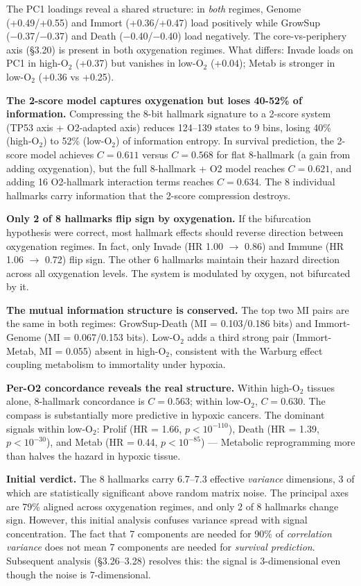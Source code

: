 \documentclass[
  11pt,
]{article}
\begin{document}
The PC1 loadings reveal a shared structure: in \emph{both} regimes,
Genome (+0.49/+0.55) and Immort (+0.36/+0.47) load positively while
GrowSup (−0.37/−0.37) and Death (−0.40/−0.40) load negatively. The
core-vs-periphery axis (§3.20) is present in both oxygenation regimes.
What differs: Invade loads on PC1 in high-\(\mathrm{O}_2\) (+0.37) but
vanishes in low-\(\mathrm{O}_2\) (+0.04); Metab is stronger in
low-\(\mathrm{O}_2\) (+0.36 vs +0.25).

\textbf{The 2-score model captures oxygenation but loses 40-52\% of
information.} Compressing the 8-bit hallmark signature to a 2-score
system (TP53 axis + O2-adapted axis) reduces 124--139 states to 9 bins,
losing 40\% (high-\(\mathrm{O}_2\)) to 52\% (low-\(\mathrm{O}_2\)) of
information entropy. In survival prediction, the 2-score model achieves
\(C = 0.611\) versus \(C = 0.568\) for flat 8-hallmark (a gain from
adding oxygenation), but the full 8-hallmark + O2 model reaches
\(C = 0.621\), and adding 16 O2-hallmark interaction terms reaches
\(C = 0.634\). The 8 individual hallmarks carry information that the
2-score compression destroys.

\textbf{Only 2 of 8 hallmarks flip sign by oxygenation.} If the
bifurcation hypothesis were correct, most hallmark effects should
reverse direction between oxygenation regimes. In fact, only Invade (HR
1.00 \(\to\) 0.86) and Immune (HR 1.06 \(\to\) 0.72) flip sign. The
other 6 hallmarks maintain their hazard direction across all oxygenation
levels. The system is modulated by oxygen, not bifurcated by it.

\textbf{The mutual information structure is conserved.} The top two MI
pairs are the same in both regimes: GrowSup-Death (MI = 0.103/0.186
bits) and Immort-Genome (MI = 0.067/0.153 bits). Low-\(\mathrm{O}_2\)
adds a third strong pair (Immort-Metab, MI = 0.055) absent in
high-\(\mathrm{O}_2\), consistent with the Warburg effect coupling
metabolism to immortality under hypoxia.

\textbf{Per-O2 concordance reveals the real structure.} Within
high-\(\mathrm{O}_2\) tissues alone, 8-hallmark concordance is
\(C = 0.563\); within low-\(\mathrm{O}_2\), \(C = 0.630\). The compass
is substantially more predictive in hypoxic cancers. The dominant
signals within low-\(\mathrm{O}_2\): Prolif (HR = 1.66,
\(p < 10^{-110}\)), Death (HR = 1.39, \(p < 10^{-30}\)), and Metab (HR =
0.44, \(p < 10^{-85}\)) --- Metabolic reprogramming more than halves the
hazard in hypoxic tissue.

\textbf{Initial verdict.} The 8 hallmarks carry 6.7--7.3 effective
\emph{variance} dimensions, 3 of which are statistically significant
above random matrix noise. The principal axes are 79\% aligned across
oxygenation regimes, and only 2 of 8 hallmarks change sign. However,
this initial analysis confuses variance spread with signal
concentration. The fact that 7 components are needed for 90\% of
\emph{correlation variance} does not mean 7 components are needed for
\emph{survival prediction}. Subsequent analysis (§3.26--3.28) resolves
this: the signal is 3-dimensional even though the noise is
7-dimensional.
\end{document}
